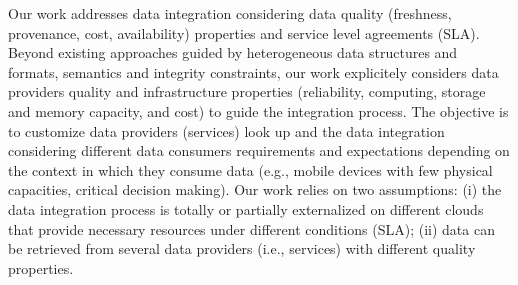 
%



Our work addresses data integration considering data quality (freshness, provenance, cost, availability) properties and service level agreements (SLA). Beyond existing  approaches guided by heterogeneous data structures and formats, semantics and  integrity constraints, our work  explicitely considers data providers quality  and infrastructure properties (reliability, computing, storage and memory capacity, and cost) to guide the integration process. The objective is to customize data providers (services) look up and the data integration considering different data consumers requirements and expectations depending on the context in which  they consume data (e.g., mobile devices with few physical capacities, critical decision making). Our work relies on two assumptions: (i) the data integration process is totally or partially externalized on different clouds that provide necessary resources under different conditions (SLA); (ii) data can be retrieved from several data providers (i.e., services) with different quality properties.

